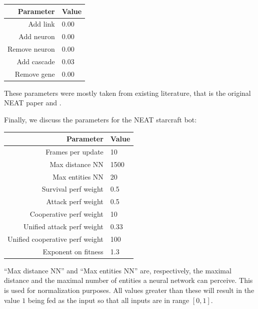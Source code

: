 \begin{tabular}{rl}
    \toprule
    Parameter & Value \\
    \midrule
    Add link & 0.00 \\
    Add neuron & 0.00 \\
    Remove neuron & 0.00 \\
    Add cascade & 0.03 \\
    Remove gene & 0.00 \\
    \bottomrule
\end{tabular}

These parameters were mostly taken from existing literature, that is the
original NEAT paper \cite{Stanley02Neat} and \cite{Kohl09FracturedProblems}.


Finally, we discuss the parameters for the NEAT starcraft bot:

\begin{tabular}{rl}
    \toprule
    Parameter & Value \\
    \midrule
    Frames per update & 10 \\
    Max distance NN & 1500 \\
    Max entities NN  & 20 \\[1ex]

    Survival perf weight & 0.5 \\
    Attack perf weight  & 0.5 \\
    Cooperative perf weight & 10 \\
    Unified attack perf weight & 0.33 \\
    Unified cooperative perf weight & 100 \\
    Exponent on fitness & 1.3 \\
    \bottomrule
\end{tabular}

``Max distance NN'' and ``Max entities NN'' are, respectively, the
maximal distance and the maximal number of entities a neural network
can perceive.  This is used for normalization purposes. All values
greater than these will result in the value \(1\) being fed as the
input so that all inputs are in range \([0, 1]\).

